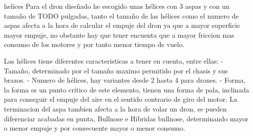 
helices
                Para el dron diseñado he escogido unas hélices con 3 aspas y con un tamaño de TODO pulgadas, tanto el tamaño de las hélices como el numero de aspas afecta a la hora de calcular el empuje del dron ya que a mayor superficie mayor empuje, no obstante hay que tener encuenta que a mayor friccion mas consumo de los motores y por tanto menor tiempo de vuelo.
                
                Las hélices tiene diferentes caracteristicas a tener en cuenta, entre ellas:
                    - Tamaño, determinado por el tamaño maximo permitido por el chasis y sus brazos.
                    - Numero de hélices, hay variantes desde 2 hasta 4 para drones.
                    - Forma, la forma es un punto crítico de este elemento, tienen una forma de pala, inclinada para conseguir el empuje del aire en el sentido contrario de giro del motor. La terminacion del aspa tambien afecta a la hora de volar un dron, se pueden diferenciar acabadas en punta,  Bullnose e Hibridas bullnose, determinando mayor o menor empuje y por consecuente mayor o menor consumo.